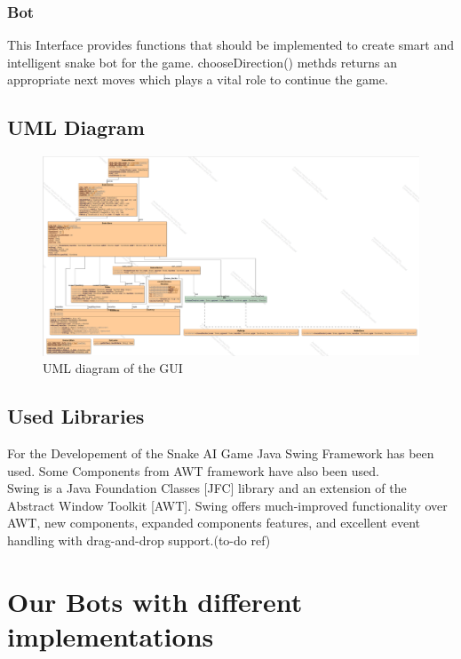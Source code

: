 \documentclass[a4paper,12pt]{article}
\begin{document}
\subsubsection{Bot}
This Interface provides functions that should be implemented to create smart and intelligent snake bot for the game. chooseDirection() methds returns an appropriate next moves which plays a vital role to continue the game. 

\subsection{UML Diagram}

\begin{figure}[h]
\centering
\includegraphics[scale=0.26]{ui.png}
\caption{UML diagram of the GUI}
\end{figure}

\subsection{Used Libraries}
For the Developement of the Snake AI Game Java Swing Framework has been used.
Some Components from AWT framework have also been used.\\ 
Swing is a Java Foundation Classes [JFC] library and an extension of the Abstract Window Toolkit [AWT]. Swing offers much-improved functionality over AWT, new components, expanded components features, and excellent event handling with drag-and-drop support.(to-do ref)
 
\section{Our Bots with different implementations}
\end{document}
